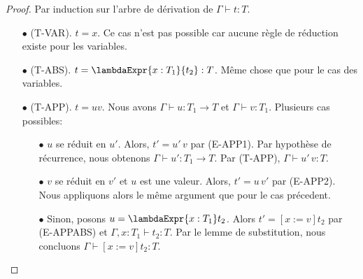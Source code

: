 \begin{proof}
  \label{proof:simply-typed-lambda-calculus-preservation}
  Par induction sur l'arbre de dérivation de $\Gamma \vdash t : T$.
  \begin{itemize}
  \item[$\bullet$] (T-VAR). $t = x$. Ce cas n'est pas possible car aucune règle de
    réduction existe pour les variables.
  \item[$\bullet$] (T-ABS). $t = \lambdaExpr{x : T_{1}}{t_{2}} : T$. Même chose que pour le
    cas des variables.
  \item[$\bullet$] (T-APP). $t = u v$. Nous avons $\Gamma
    \vdash u : T_{1} \rightarrow T$ et $\Gamma \vdash v : T_{1}$. Plusieurs cas possibles:
    \begin{itemize}
    \item[$\bullet$] $u$ se réduit en $u'$. Alors, $t' = u' \, v$ par (E-APP1). Par hypothèse
      de récurrence, nous
      obtenons $\Gamma \vdash u' : T_{1} \rightarrow T$. Par (T-APP),
      $\Gamma \vdash u' \, v : T$.
    \item[$\bullet$] $v$ se réduit en $v'$ et $u$ est une valeur. Alors, $t' = u \, v'$ par
      (E-APP2). Nous appliquons alors le même argument que pour le cas précedent.
    \item[$\bullet$] Sinon, posons $u = \lambdaExpr{x : T_{1}} t_{2}$.
      Alors $t' = [x := v]t_{2}$ par (E-APPABS) et $\Gamma, x : T_{1}
      \vdash t_{2} : T$. Par le lemme de substitution, nous concluons $\Gamma \vdash
      [x := v]t_{2} : T$.
    \end{itemize}
  \end{itemize}
\end{proof}
